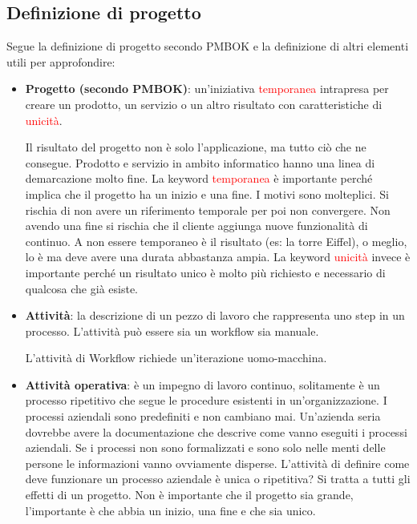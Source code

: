 \subsection{Definizione di progetto}
Segue la definizione di progetto secondo PMBOK e la definizione di altri elementi utili per approfondire:
\begin{itemize}
	\item \textbf{Progetto (secondo PMBOK)}: un'iniziativa \textcolor{red}{temporanea} intrapresa per creare un prodotto, un servizio o un altro risultato con caratteristiche di \textcolor{red}{unicità}.
	\begin{info}
		Il risultato del progetto non è solo l'applicazione, ma tutto ciò che ne consegue. Prodotto e servizio in ambito informatico hanno una linea di demarcazione molto fine.\newline
		La keyword \textcolor{red}{temporanea} è importante perché implica che il progetto ha un inizio e una fine. I motivi sono molteplici. Si rischia di non avere un riferimento temporale per poi non convergere. Non avendo una fine si rischia che il cliente aggiunga nuove funzionalità di continuo. A non essere temporaneo è il risultato (es: la torre Eiffel), o meglio, lo è ma deve avere una durata abbastanza ampia.\newline
		La keyword \textcolor{red}{unicità} invece è importante perché un risultato unico è molto più richiesto e necessario di qualcosa che già esiste.\newline
	\end{info}
	\item \textbf{Attività}: la descrizione di un pezzo di lavoro che rappresenta uno step in un processo. L'attività può essere sia un workflow sia manuale.
	\begin{info}
		L'attività di Workflow richiede un'iterazione uomo-macchina.
	\end{info}
	\item \textbf{Attività operativa}: è un impegno di lavoro continuo, solitamente è un processo ripetitivo che segue le procedure esistenti in un'organizzazione. I processi aziendali sono predefiniti e non cambiano mai. Un'azienda seria dovrebbe avere la documentazione che descrive come vanno eseguiti i processi aziendali. Se i processi non sono formalizzati e sono solo nelle menti delle persone le informazioni vanno ovviamente disperse.\newline\newline
	L'attività di definire come deve funzionare un processo aziendale è unica o ripetitiva? Si tratta a tutti gli effetti di un progetto. Non è importante che il progetto sia grande, l'importante è che abbia un inizio, una fine e che sia unico.

\end{itemize}
